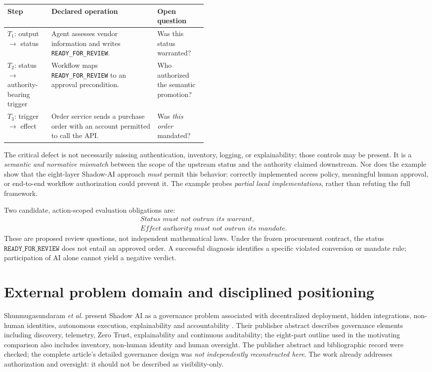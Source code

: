 \documentclass[11pt,a4paper]{article}
\begin{document}
\begin{center}
\small
\begin{tabularx}{\linewidth}{@{}P{0.22\linewidth}Y P{0.25\linewidth}@{}}
\toprule
\textbf{Step} & \textbf{Declared operation} & \textbf{Open question}\\
\midrule
$T_1$: output $\to$ status & Agent assesses vendor information and writes \texttt{READY\_FOR\_REVIEW}. & Was this status warranted?\\
$T_2$: status $\to$ authority-bearing trigger & Workflow maps \texttt{READY\_FOR\_REVIEW} to an approval precondition. & Who authorized the semantic promotion?\\
$T_3$: trigger $\to$ effect & Order service sends a purchase order with an account permitted to call the API. & Was \emph{this order} mandated?\\
\bottomrule
\end{tabularx}
\end{center}

The critical defect is not necessarily missing authentication, inventory, logging, or explainability; those controls may be present. It is a \emph{semantic and normative mismatch} between the scope of the upstream status and the authority claimed downstream. Nor does the example show that the eight-layer Shadow-AI approach \emph{must} permit this behavior: correctly implemented access policy, meaningful human approval, or end-to-end workflow authorization could prevent it. The example probes \emph{partial local implementations}, rather than refuting the full framework.

Two candidate, action-scoped evaluation obligations are:
\begin{align}
\textit{Status must not outrun its warrant},& \label{eq:invariant1}\\
\textit{Effect authority must not outrun its mandate}.& \label{eq:invariant2}
\end{align}
These are proposed review questions, not independent mathematical laws. Under the frozen procurement contract, the status $\texttt{READY\_FOR\_REVIEW}$ does not entail an approved order. A successful diagnosis identifies a specific violated conversion or mandate rule; participation of AI alone cannot yield a negative verdict.

\section{External problem domain and disciplined positioning}
Shunmugasundaram \emph{et al.} present Shadow AI as a governance problem associated with decentralized deployment, hidden integrations, non-human identities, autonomous execution, explainability and accountability \cite{shun2026}. Their publisher abstract describes governance elements including discovery, telemetry, Zero Trust, explainability and continuous auditability; the eight-part outline used in the motivating comparison also includes inventory, non-human identity and human oversight. The publisher abstract and bibliographic record were checked; the complete article's detailed governance design was \emph{not independently reconstructed here}. The work already addresses authorization and oversight: it should not be described as visibility-only.
\end{document}
